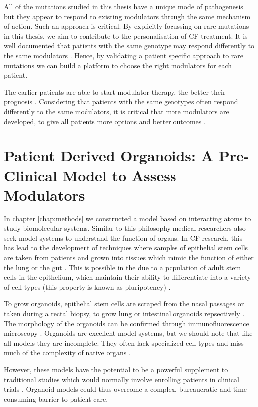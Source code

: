 All of the mutations studied in this thesis have a unique mode of pathogenesis but they appear to respond to existing modulators through the same mechanism of action. Such an approach is critical. By explicitly focussing on rare mutations in this thesis, we aim to contribute to the personalisation of CF treatment. It is well documented that patients with the same genotype may respond differently to the same modulators \cite{hanafin2021}. Hence, by validating a patient specific approach to rare mutations we can build a platform to choose the right modulators for each patient. 

 The earlier patients are able to start modulator therapy, the better their prognosis \cite{lahiri2022}. Considering that patients with the same genotypes often respond differently to the same modulators, it is critical that more modulators are developed, to give all patients more options and better outcomes \cite{hanafin2021}.

\section{Patient Derived Organoids: A Pre-Clinical Model to Assess Modulators}
In chapter \ref{chap:methods} we constructed a model based on interacting atoms to study biomolecular systems. Similar to this philosophy medical researchers also seek model systems to understand the function of organs. In CF research, this has lead to the development of techniques where samples of epithelial stem cells are taken from patients and grown into tissues which mimic the function of either the lung or the gut \cite{wong2015,depoel2020}. This is possible in the due to a population of adult stem cells in the epithelium, which maintain their ability to differentiate into a variety of cell types (this property is known as pluripotency) \cite{blanpain2007}. 

To grow organoids, epithelial stem cells are scraped from the nasal passages or taken during a rectal biopsy, to grow lung or intestinal organoids repsectively  \cite{awatade2021,sato2011}. The morphology of the organoids can be confirmed through immunofluorescence microscopy \cite{awatade2021, im2019}. Organoids are excellent model systems, but we should note that like all models they are incomplete. They often lack specialized cell types and miss much of the complexity of native organs \cite{clevers2016}. 

However, these models have the potential to be a powerful supplement to traditional studies which would normally involve enrolling patients in clinical trials \cite{pranke2019a}. Organoid models could thus overcome a complex, bureaucratic and time consuming barrier to patient care.

